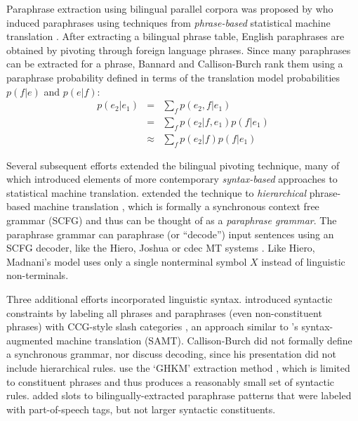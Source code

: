 \documentclass[11pt]{article}
\begin{document}
Paraphrase extraction using bilingual parallel corpora was proposed by
 who induced paraphrases using techniques
from {\it phrase-based} statistical machine translation
\cite{Koehn2003}. After extracting a bilingual phrase table, English
paraphrases are obtained by pivoting through foreign language
phrases.
Since many paraphrases can be extracted for a phrase, Bannard and
Callison-Burch rank them using a paraphrase probability defined in
terms of the translation model probabilities $p(f | e)$ and $p(e |
f)$: \nocite{Callison-Burch2005}
\begin{eqnarray}
  p(e_2|e_1) &=& \sum_f p(e_2,f|e_1)\\
                  &=& \sum_f p(e_2|f,e_1) p(f|e_1) \\
                  &\approx& \sum_f p(e_2|f) p(f|e_1)
\label{paraphrase_prob_eqn}
\end{eqnarray}

Several subsequent efforts extended the bilingual pivoting technique,
many of which introduced elements of more contemporary {\it
  syntax-based} approaches to statistical machine translation.
 extended the technique to {\it hierarchical}
phrase-based machine translation \cite{Chiang2005}, which is formally
a synchronous context free grammar (SCFG) and thus can be thought of
as a {\it paraphrase grammar}. The paraphrase grammar can paraphrase
(or ``decode'') input sentences using an SCFG decoder, like the Hiero,
Joshua or cdec MT systems \cite{Chiang2007,Joshua-WMT,Dyer_etal_2010}.
Like Hiero, Madnani's model uses only a single nonterminal symbol
$X$ instead of linguistic non-terminals.


Three additional efforts incorporated linguistic
syntax.  introduced syntactic constraints
by labeling all phrases and paraphrases (even non-constituent phrases)
with CCG-style slash categories \cite{Steedman1999}, an approach similar to
's syntax-augmented machine translation
(SAMT). Callison-Burch did not formally define a synchronous grammar,
nor discuss decoding, since his presentation did not include
hierarchical rules.   use the `GHKM'
extraction method \cite{Galley2004}, which is limited to constituent
phrases and thus produces a reasonably small set of syntactic rules.
 added slots to bilingually-extracted paraphrase
patterns that were labeled with part-of-speech tags, but not larger
syntactic constituents.
\end{document}
